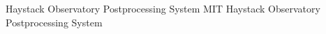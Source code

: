 %
%
%
\begin{acronym}
 Haystack Observatory Postprocessing System
 MIT Haystack Observatory Postprocessing System
\end{acronym} 
%
%
